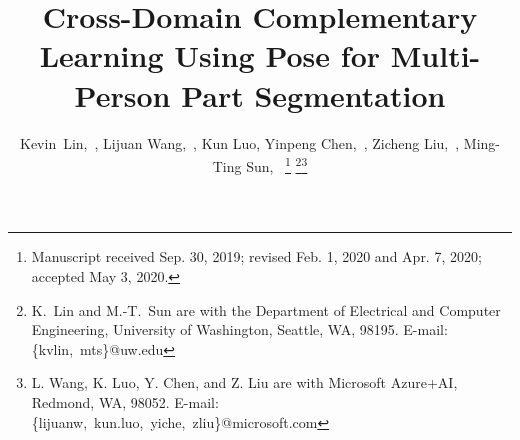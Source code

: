 \documentclass[final]{IEEEtran}
\begin{document}
\title{Cross-Domain Complementary Learning Using Pose for Multi-Person Part Segmentation}


\author{Kevin~Lin,~, Lijuan Wang,~, Kun Luo, Yinpeng Chen,~, Zicheng Liu,~, Ming-Ting Sun,~
\vspace{-5mm}
\thanks{Manuscript received Sep. 30, 2019; revised Feb. 1, 2020 and Apr. 7, 2020; accepted May 3, 2020.}
\thanks{K.~Lin and M.-T.~Sun are with the Department of Electrical and Computer Engineering, University of Washington, Seattle, WA, 98195. E-mail: \{kvlin,~mts\}@uw.edu}\thanks{L. Wang, K. Luo, Y. Chen, and Z. Liu are with Microsoft Azure+AI, Redmond, WA, 98052. E-mail: \{lijuanw,~kun.luo,~yiche,~zliu\}@microsoft.com}}





\end{document}
